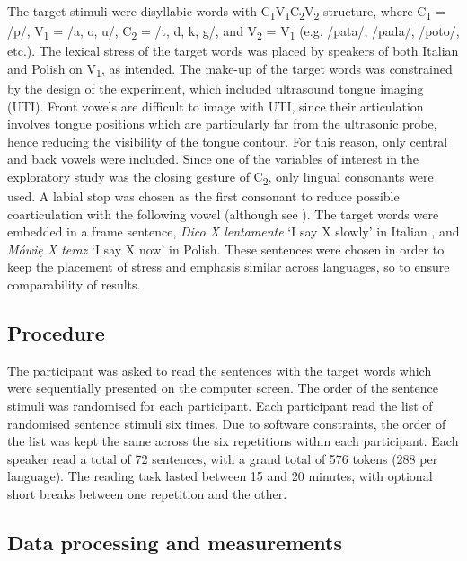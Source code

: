 \documentclass[preprint]{JASAnew}
\begin{document}
The target stimuli were disyllabic words with
C\textsubscript{1}V\textsubscript{1}C\textsubscript{2}V\textsubscript{2}
structure, where C\textsubscript{1} = /p/, V\textsubscript{1} = /a, o,
u/, C\textsubscript{2} = /t, d, k, g/, and V\textsubscript{2} =
V\textsubscript{1} (e.g. /pata/, /pada/, /poto/, etc.). The lexical
stress of the target words was placed by speakers of both Italian and
Polish on V\textsubscript{1}, as intended. The make-up of the target
words was constrained by the design of the experiment, which included
ultrasound tongue imaging (UTI). Front vowels are difficult to image
with UTI, since their articulation involves tongue positions which are
particularly far from the ultrasonic probe, hence reducing the
visibility of the tongue contour. For this reason, only central and back
vowels were included. Since one of the variables of interest in the
exploratory study was the closing gesture of C\textsubscript{2}, only
lingual consonants were used. A labial stop was chosen as the first
consonant to reduce possible coarticulation with the following vowel
(although see \citealt{vazquez-alvarez2007}). The target words were
embedded in a frame sentence, \emph{Dico X lentamente} `I say X slowly'
in Italian \citep[following][]{hajek2008}, and \emph{Mówię X teraz} `I
say X now' in Polish. These sentences were chosen in order to keep the
placement of stress and emphasis similar across languages, so to ensure
comparability of results.

\hypertarget{procedure}{%
\subsection{Procedure}\label{procedure}}

The participant was asked to read the sentences with the target words
which were sequentially presented on the computer screen. The order of
the sentence stimuli was randomised for each participant. Each
participant read the list of randomised sentence stimuli six times. Due
to software constraints, the order of the list was kept the same across
the six repetitions within each participant. Each speaker read a total
of 72 sentences, with a grand total of 576 tokens (288 per language).
The reading task lasted between 15 and 20 minutes, with optional short
breaks between one repetition and the other.

\hypertarget{data-processing-and-measurements}{%
\subsection{Data processing and
measurements}\label{data-processing-and-measurements}}
\end{document}

